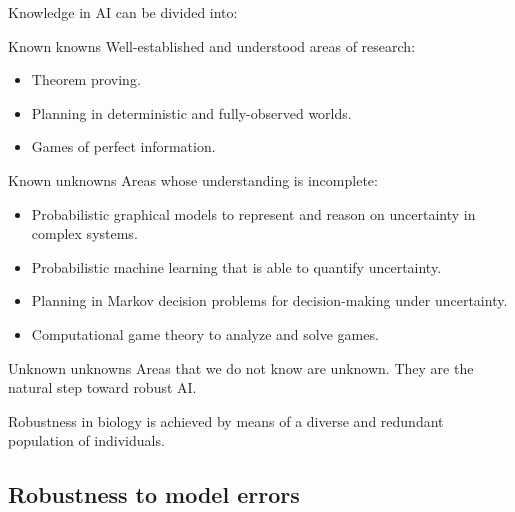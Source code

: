 \begin{remark}[Uncertainty in AI]
    Knowledge in AI can be divided into:
    \begin{descriptionlist}
        \item[Known knowns] 
            Well-established and understood areas of research:
            \begin{itemize}
                \item Theorem proving.
                \item Planning in deterministic and fully-observed worlds.
                \item Games of perfect information.
            \end{itemize}

        \item[Known unknowns] 
            Areas whose understanding is incomplete:
            \begin{itemize}
                \item Probabilistic graphical models to represent and reason on uncertainty in complex systems.
                \item Probabilistic machine learning that is able to quantify uncertainty.
                \item Planning in Markov decision problems for decision-making under uncertainty.
                \item Computational game theory to analyze and solve games.
            \end{itemize}

        \item[Unknown unknowns] 
            Areas that we do not know are unknown. They are the natural step toward robust AI.
    \end{descriptionlist}
\end{remark}


\begin{remark}
    Robustness in biology is achieved by means of a diverse and redundant population of individuals.
\end{remark}


\subsection{Robustness to model errors}

